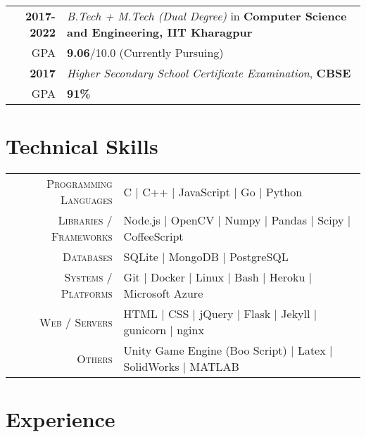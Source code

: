 \documentclass[a4paper,10pt]{extarticle} %
\begin{document}
\begin{tabular}{r|p{17.5cm}}	
\textbf{2017-2022} & \textit{B.Tech + M.Tech (Dual Degree)} in \textbf{Computer Science and Engineering, IIT Kharagpur}\\
\hfill GPA & \textbf{9.06}/10.0 (Currently Pursuing)\\
\textbf{2017} & \textit{Higher Secondary School Certificate Examination}, \textbf{CBSE}\\
\hfill GPA & \textbf{91\%}\\
\end{tabular}


\section{\textcolor{primary}{Technical Skills}}

\begin{tabular}{r|p{15cm}}
\textsc{Programming Languages} & C | C++ | JavaScript | Go | Python  \\
\textsc{Libraries / Frameworks} & Node.js | OpenCV | Numpy | Pandas | Scipy | CoffeeScript\\
\textsc{Databases} & SQLite | MongoDB | PostgreSQL\\
\textsc{Systems / Platforms} & Git | Docker | Linux | Bash | Heroku | Microsoft Azure\\
\textsc{Web / Servers} & HTML | CSS | jQuery | Flask | Jekyll | gunicorn | nginx\\
\textsc{Others} & Unity Game Engine (Boo Script) | Latex | SolidWorks | MATLAB
\end{tabular}


\section{\textcolor{primary}{Experience}}
\end{document}
